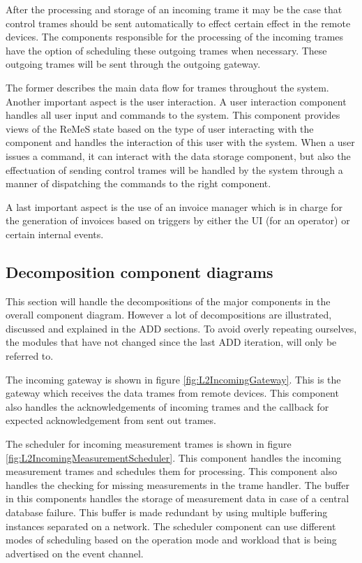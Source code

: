 After the processing and storage of an incoming trame it may be the case that control trames should be sent automatically to effect certain effect in the remote devices. The components responsible for the processing of the incoming trames have the option of scheduling these outgoing trames when necessary. 
These outgoing trames will be sent through the outgoing gateway. 

The former describes the main data flow for trames throughout the system. Another important aspect is the user interaction. A user interaction component handles all user input and commands to the system. This component provides views of the ReMeS state based on the type of user interacting with the component and handles the interaction of this user with the system. When a user issues a command, it can interact with the data storage component, but also the effectuation of sending control trames will be handled by the system through a manner of dispatching the commands to the right component. 

A last important aspect is the use of an invoice manager which is in charge for the generation of invoices based on triggers by either the UI (for an operator) or certain internal events.

\subsection{Decomposition component diagrams}
\label{sec:DecompCompDiag}
This section will handle the decompositions of the major components in the overall component diagram. 
However a lot of decompositions are illustrated, discussed and explained in the ADD sections. 
To avoid overly repeating ourselves, the modules that have not changed since the last ADD iteration, will
only be referred to. 

The incoming gateway is shown in figure \ref{fig:L2IncomingGateway}. This is the gateway which receives the data trames from remote devices. This component also handles the acknowledgements of incoming trames and the callback for expected acknowledgement from sent out trames.

The scheduler for incoming measurement trames is shown in figure \ref{fig:L2IncomingMeasurementScheduler}. 
This component handles the incoming measurement trames and schedules them for processing. 
This component also handles the checking for missing measurements in the trame handler. 
The buffer in this components handles the storage of measurement data in case of a central database failure. 
This buffer is made redundant by using multiple buffering instances separated on a network. 
The scheduler component can use different modes of scheduling based on the operation mode and workload that is being advertised on the event channel. 

